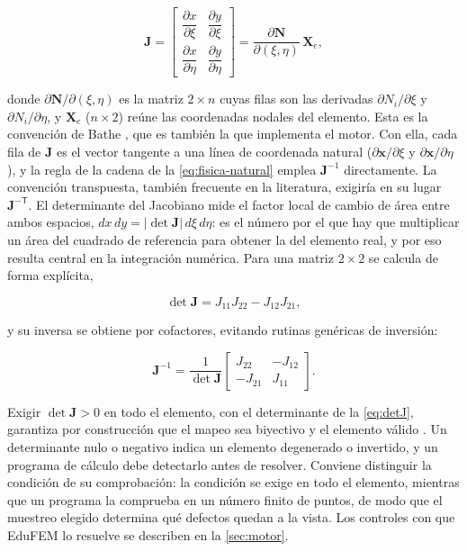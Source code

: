 \begin{equation}
\bm{J} =
\begin{bmatrix}
\dfrac{\partial x}{\partial \xi} & \dfrac{\partial y}{\partial \xi} \\[6pt]
\dfrac{\partial x}{\partial \eta} & \dfrac{\partial y}{\partial \eta}
\end{bmatrix}
= \frac{\partial \bm{N}}{\partial(\xi,\eta)}\,\bm{X}_e,
\label{eq:jacobiano}
\end{equation}

donde $\partial\bm{N}/\partial(\xi,\eta)$ es la matriz $2\times n$ cuyas filas son las derivadas $\partial N_i/\partial\xi$ y $\partial N_i/\partial\eta$, y $\bm{X}_e$ ($n\times 2$) reúne las coordenadas nodales del elemento. Esta es la convención de Bathe \autocite[p.~345]{bathe2014fem}, que es también la que implementa el motor. Con ella, cada fila de $\bm{J}$ es el vector tangente a una línea de coordenada natural ($\partial\bm{x}/\partial\xi$ y $\partial\bm{x}/\partial\eta$), y la regla de la cadena de la \autoref{eq:fisica-natural} emplea $\bm{J}^{-1}$ directamente. La convención transpuesta, también frecuente en la literatura, exigiría en su lugar $\bm{J}^{-\mathsf{T}}$. El determinante del Jacobiano mide el factor local de cambio de área entre ambos espacios, $dx\,dy = |\det\bm{J}|\,d\xi\,d\eta$: es el número por el que hay que multiplicar un área del cuadrado de referencia para obtener la del elemento real, y por eso resulta central en la integración numérica. Para una matriz $2\times2$ se calcula de forma explícita,

\begin{equation}
\det\bm{J} = J_{11}J_{22} - J_{12}J_{21},
\label{eq:detJ}
\end{equation}

y su inversa se obtiene por cofactores, evitando rutinas genéricas de inversión:

\begin{equation}
\bm{J}^{-1} = \frac{1}{\det\bm{J}}
\begin{bmatrix}
J_{22} & -J_{12} \\
-J_{21} & J_{11}
\end{bmatrix}.
\label{eq:invJ}
\end{equation}

Exigir $\det\bm{J} > 0$ en todo el elemento, con el determinante de la \autoref{eq:detJ}, garantiza por construcción que el mapeo sea biyectivo y el elemento válido \autocites[pp.~346-347]{bathe2014fem}[p.~236]{cook2002concepts}. Un determinante nulo o negativo indica un elemento degenerado o invertido, y un programa de cálculo debe detectarlo antes de resolver. Conviene distinguir la condición de su comprobación: la condición se exige en todo el elemento, mientras que un programa la comprueba en un número finito de puntos, de modo que el muestreo elegido determina qué defectos quedan a la vista. Los controles con que EduFEM lo resuelve se describen en la \autoref{sec:motor}.

